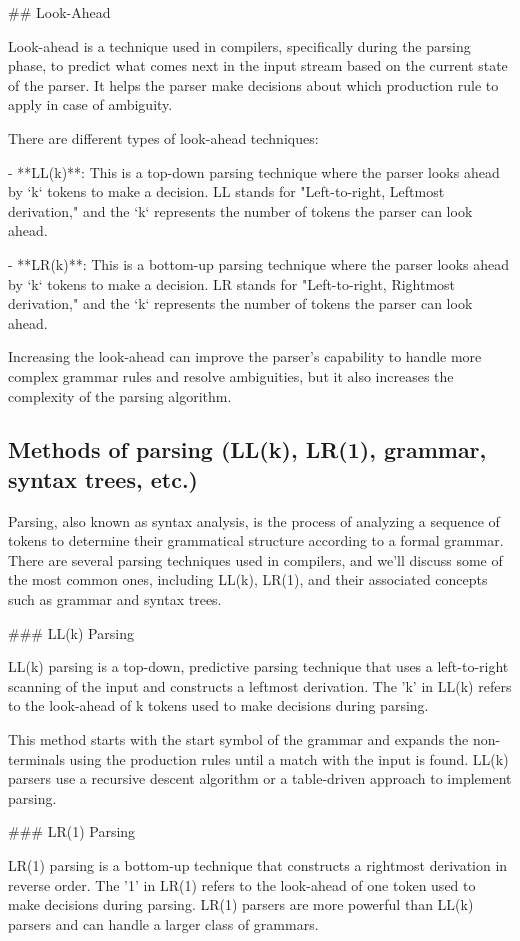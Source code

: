 \documentclass{article}
\begin{document}
## Look-Ahead

Look-ahead is a technique used in compilers, specifically during the parsing phase, to predict what comes next in the input stream based on the current state of the parser. It helps the parser make decisions about which production rule to apply in case of ambiguity.

There are different types of look-ahead techniques:

- **LL(k)**: This is a top-down parsing technique where the parser looks ahead by `k` tokens to make a decision. LL stands for "Left-to-right, Leftmost derivation," and the `k` represents the number of tokens the parser can look ahead.

- **LR(k)**: This is a bottom-up parsing technique where the parser looks ahead by `k` tokens to make a decision. LR stands for "Left-to-right, Rightmost derivation," and the `k` represents the number of tokens the parser can look ahead.

Increasing the look-ahead can improve the parser's capability to handle more complex grammar rules and resolve ambiguities, but it also increases the complexity of the parsing algorithm.


\subsection{Methods of parsing (LL(k), LR(1), grammar, syntax trees, etc.)}

Parsing, also known as syntax analysis, is the process of analyzing a sequence of tokens to determine their grammatical structure according to a formal grammar. There are several parsing techniques used in compilers, and we'll discuss some of the most common ones, including LL(k), LR(1), and their associated concepts such as grammar and syntax trees.

### LL(k) Parsing

LL(k) parsing is a top-down, predictive parsing technique that uses a left-to-right scanning of the input and constructs a leftmost derivation. The 'k' in LL(k) refers to the look-ahead of k tokens used to make decisions during parsing.

This method starts with the start symbol of the grammar and expands the non-terminals using the production rules until a match with the input is found. LL(k) parsers use a recursive descent algorithm or a table-driven approach to implement parsing.

### LR(1) Parsing

LR(1) parsing is a bottom-up technique that constructs a rightmost derivation in reverse order. The '1' in LR(1) refers to the look-ahead of one token used to make decisions during parsing. LR(1) parsers are more powerful than LL(k) parsers and can handle a larger class of grammars.
\end{document}
